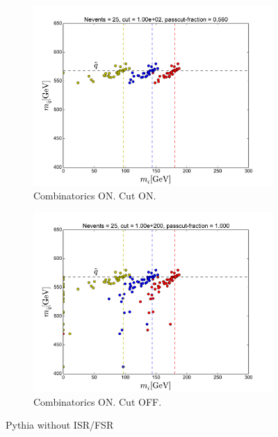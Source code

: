 \documentclass[twoside,english]{uiofysmaster}
\begin{document}
\begin{figure}[hbt]
	\begin{subfigure}[b]{0.49\textwidth}
		\includegraphics[width=\textwidth]{figures/making-sense/pythia_noIFSR_combinatorics-ON_cut-100.pdf} 
		\caption{Combinatorics ON. Cut ON.}
	\end{subfigure}
	\begin{subfigure}[b]{0.49\textwidth}
		\includegraphics[width=\textwidth]{figures/making-sense/pythia_noIFSR_combinatorics-ON_nocut.pdf} 
		\caption{Combinatorics ON. Cut OFF.}
	\end{subfigure}
	\caption{Pythia without ISR/FSR}
\end{figure}
\end{document}
